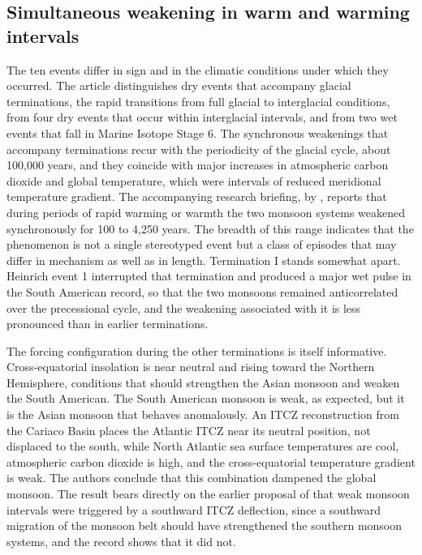 \documentclass[11pt]{article}
\theoremstyle{definition}
\begin{document}
\subsection{Simultaneous weakening in warm and warming intervals}

The ten events differ in sign and in the climatic conditions under which they occurred. The article distinguishes dry events that accompany glacial terminations, the rapid transitions from full glacial to interglacial conditions, from four dry events that occur within interglacial intervals, and from two wet events that fall in Marine Isotope Stage 6. The synchronous weakenings that accompany terminations recur with the periodicity of the glacial cycle, about 100,000 years, and they coincide with major increases in atmospheric carbon dioxide and global temperature, which were intervals of reduced meridional temperature gradient. The accompanying research briefing, by \citet{rodbellolson2026}, reports that during periods of rapid warming or warmth the two monsoon systems weakened synchronously for 100 to 4,250 years. The breadth of this range indicates that the phenomenon is not a single stereotyped event but a class of episodes that may differ in mechanism as well as in length. Termination I stands somewhat apart. Heinrich event 1 interrupted that termination and produced a major wet pulse in the South American record, so that the two monsoons remained anticorrelated over the precessional cycle, and the weakening associated with it is less pronounced than in earlier terminations.

The forcing configuration during the other terminations is itself informative. Cross-equatorial insolation is near neutral and rising toward the Northern Hemisphere, conditions that should strengthen the Asian monsoon and weaken the South American. The South American monsoon is weak, as expected, but it is the Asian monsoon that behaves anomalously. An ITCZ reconstruction from the Cariaco Basin places the Atlantic ITCZ near its neutral position, not displaced to the south, while North Atlantic sea surface temperatures are cool, atmospheric carbon dioxide is high, and the cross-equatorial temperature gradient is weak. The authors conclude that this combination dampened the global monsoon. The result bears directly on the earlier proposal of \citet{cheng2016} that weak monsoon intervals were triggered by a southward ITCZ deflection, since a southward migration of the monsoon belt should have strengthened the southern monsoon systems, and the record shows that it did not.
\end{document}
